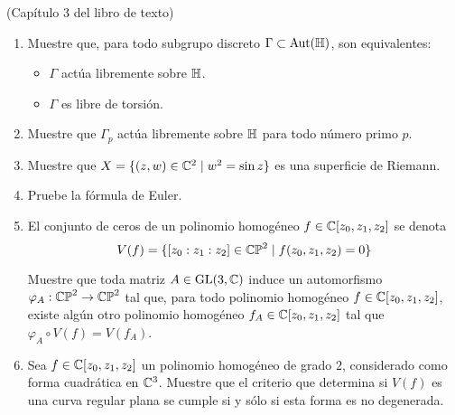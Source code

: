 \begin{exercise}
(Capítulo 3 del libro de texto)

\begin{enumerate}[label=\alph*)]
    \item Muestre que, para todo subgrupo discreto $\Gamma \subset \operatorname{Aut}(\mathbb H)$, son equivalentes:
    \begin{itemize}
        \item $\Gamma$ actúa libremente sobre $\mathbb H$.
        \item $\Gamma$ es libre de torsión.
    \end{itemize}
    
    \item Muestre que $\Gamma_p$ actúa libremente sobre $\mathbb H$ para todo número primo $p$.
    
    \item Muestre que $X = \{ (z, w) \in \mathbb C^2 \mid w^2 = \sin z \}$ es una superficie de Riemann.
    
    \item Pruebe la fórmula de Euler.
    
    \item El conjunto de ceros de un polinomio homogéneo $f \in \mathbb C[z_0, z_1, z_2]$ se denota
    $$V(f) = \{ [z_0 : z_1 : z_2] \in \mathbb {CP}^2 \mid f(z_0, z_1, z_2) = 0 \}$$
    
    Muestre que toda matriz $A \in \operatorname{GL}(3, \mathbb C)$ induce un automorfismo $\varphi_A : \mathbb {CP}^2 \to \mathbb {CP}^2$ tal que, para todo polinomio homogéneo $f \in \mathbb C[z_0, z_1, z_2]$, existe algún otro polinomio homogéneo $f_A \in \mathbb C[z_0, z_1, z_2]$ tal que $\varphi_A \circ V(f) = V(f_A)$.
    
    \item Sea $f \in \mathbb C[z_0, z_1, z_2]$ un polinomio homogéneo de grado $2$, considerado como forma cuadrática en $\mathbb C^3$. Muestre que el criterio que determina si $V(f)$ es una curva regular plana se cumple si y sólo si esta forma es no degenerada.
\end{enumerate}
\end{exercise}

